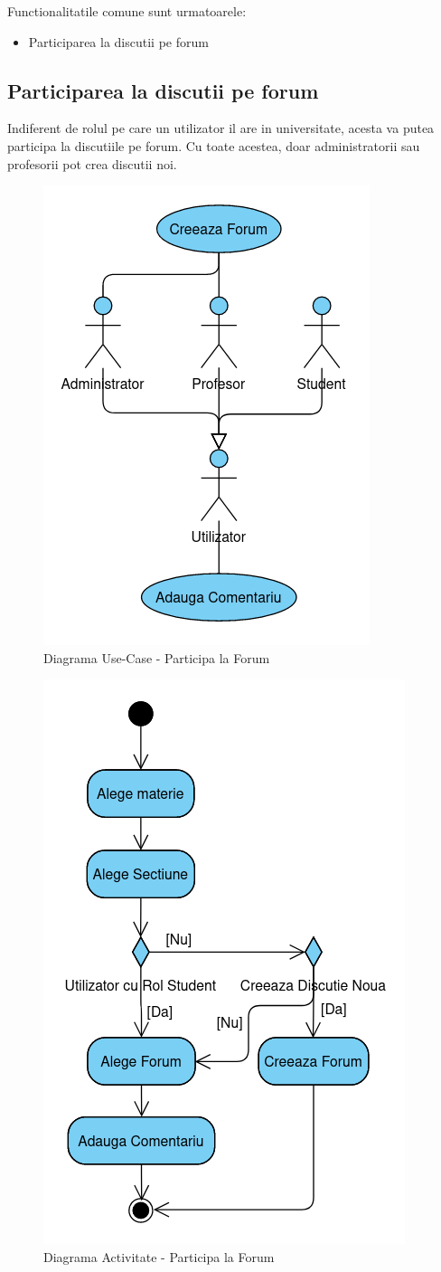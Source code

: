 \documentclass[12pt, a4paper, oneside, romanian]{teza-upb}
\begin{document}
Functionalitatile comune sunt urmatoarele:
\begin{itemize}
	\item Participarea la discutii pe forum
\end{itemize}

\subsection{Participarea la discutii pe forum}

Indiferent de rolul pe care un utilizator il are in universitate, acesta va putea participa la discutiile pe forum. Cu toate acestea, doar administratorii sau profesorii pot crea discutii noi.

\begin{figure}[H]
\centering
\includegraphics*[width=0.45\columnwidth]{diagrama-use-case-participa-la-forum}
\caption{Diagrama Use-Case - Participa la Forum}
\label{diagrama-use-case-participa-la-forum}
\end{figure}

\begin{figure}[H]
\centering
\includegraphics*[width=0.5\columnwidth]{diagrama-activitate-participa-la-forum}
\caption{Diagrama Activitate - Participa la Forum}
\label{diagrama-activitate-participa-la-forum}
\end{figure}
\end{document}
